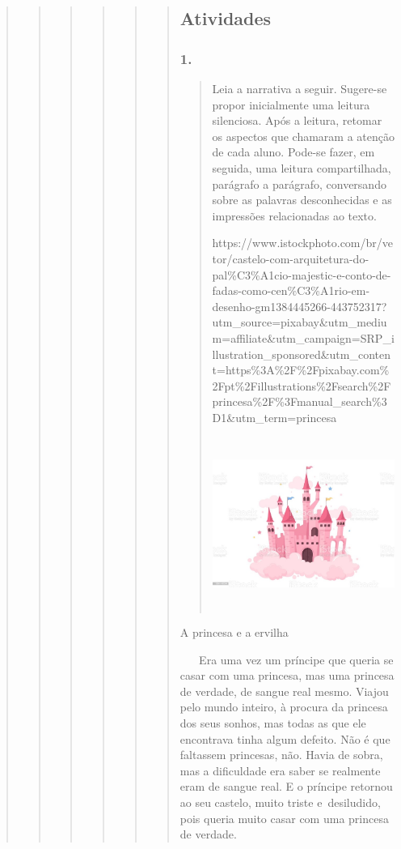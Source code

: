 \begin{quote}
\begin{quote}
\begin{quote}
\begin{quote}
\begin{quote}
\begin{quote}
\subsection{Atividades}\label{atividades-9}

\subsubsection{1. }\label{section-71}

\begin{quote}
Leia a narrativa a seguir. Sugere-se propor inicialmente uma leitura
silenciosa. Após a leitura, retomar os aspectos que chamaram a atenção
de cada aluno. Pode-se fazer, em seguida, uma leitura compartilhada,
parágrafo a parágrafo, conversando sobre as palavras desconhecidas e as
impressões relacionadas ao texto.

https://www.istockphoto.com/br/vetor/castelo-com-arquitetura-do-pal\%C3\%A1cio-majestic-e-conto-de-fadas-como-cen\%C3\%A1rio-em-desenho-gm1384445266-443752317?utm\_source=pixabay\&utm\_medium=affiliate\&utm\_campaign=SRP\_illustration\_sponsored\&utm\_content=https\%3A\%2F\%2Fpixabay.com\%2Fpt\%2Fillustrations\%2Fsearch\%2Fprincesa\%2F\%3Fmanual\_search\%3D1\&utm\_term=princesa

\includegraphics[width=3.15101in,height=2.21875in]{media/image34.jpeg}
\end{quote}

A princesa e a ervilha

~ ~ Era uma vez um príncipe que queria se casar com uma princesa, mas
uma princesa de verdade, de sangue real mesmo. Viajou pelo mundo
inteiro, à procura da princesa dos seus sonhos, mas todas as que ele
encontrava tinha algum defeito. Não é que faltassem princesas, não.
Havia de sobra, mas a dificuldade era saber se realmente eram de sangue
real. E o príncipe retornou ao seu castelo, muito triste e~desiludido,
pois queria muito casar com uma princesa de verdade.


\end{quote}
\end{quote}
\end{quote}
\end{quote}
\end{quote}
\end{quote}
